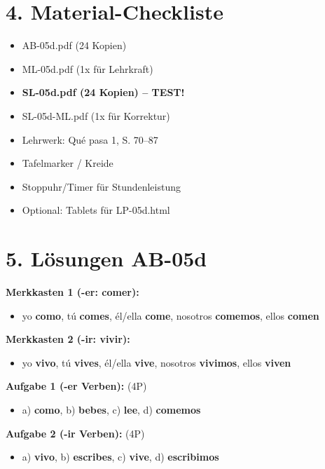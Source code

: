 \documentclass[11pt, a4paper]{article}
\newcommand{\sequenz}{05}
\newcommand{\block}{d}
\newcommand{\lerngruppengroesse}{24}
\newcommand{\loesung}[1]{\textcolor{loesung}{\textbf{#1}}}
\begin{document}
\section*{4. Material-Checkliste}

\begin{materialbox}
\begin{itemize}[label=$\square$]
    \item AB-\sequenz\block.pdf (\lerngruppengroesse{} Kopien)
    \item ML-\sequenz\block.pdf (1x für Lehrkraft)
    \item \textbf{SL-\sequenz\block.pdf (\lerngruppengroesse{} Kopien) -- TEST!}
    \item SL-\sequenz\block-ML.pdf (1x für Korrektur)
    \item Lehrwerk: Qué pasa 1, S. 70--87
    \item Tafelmarker / Kreide
    \item Stoppuhr/Timer für Stundenleistung
    \item Optional: Tablets für LP-05d.html
\end{itemize}
\end{materialbox}

\section*{5. Lösungen AB-\sequenz\block}

\textbf{Merkkasten 1 (-er: comer):}
\begin{itemize}
    \item yo \loesung{como}, tú \loesung{comes}, él/ella \loesung{come}, nosotros \loesung{comemos}, ellos \loesung{comen}
\end{itemize}

\textbf{Merkkasten 2 (-ir: vivir):}
\begin{itemize}
    \item yo \loesung{vivo}, tú \loesung{vives}, él/ella \loesung{vive}, nosotros \loesung{vivimos}, ellos \loesung{viven}
\end{itemize}

\textbf{Aufgabe 1 (-er Verben):} (4P)
\begin{itemize}
    \item a) \loesung{como}, b) \loesung{bebes}, c) \loesung{lee}, d) \loesung{comemos}
\end{itemize}

\textbf{Aufgabe 2 (-ir Verben):} (4P)
\begin{itemize}
    \item a) \loesung{vivo}, b) \loesung{escribes}, c) \loesung{vive}, d) \loesung{escribimos}
\end{itemize}
\end{document}
